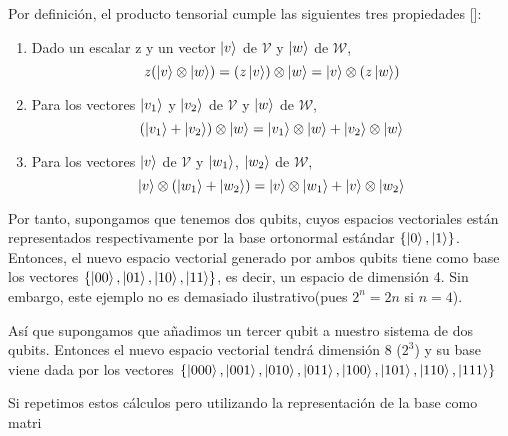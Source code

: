 Por definición, el producto tensorial cumple las siguientes tres propiedades [\cite{nielsen2001quantum}]:
\begin{enumerate}
\item Dado un escalar z y un vector $\left|v\right\rangle$ de $\mathcal{V}$ y $\left|w\right\rangle$ de $\mathcal{W}$,\\
\begin{equation}
z(\left|v\right\rangle\otimes\left|w\right\rangle)= (z\left|v\right\rangle)\otimes\left|w\right\rangle = \left|v\right\rangle\otimes (z\left|w\right\rangle)
\end{equation}

\item Para los vectores $\left|v_1\right\rangle$  y $\left|v_2\right\rangle$ de $\mathcal{V}$ y $\left|w\right\rangle$ de $\mathcal{W}$,\\
\begin{equation}
(\left|v_1\right\rangle+\left|v_2\right\rangle)\otimes\left|w\right\rangle=\left|v_1\right\rangle\otimes\left|w\right\rangle+\left|v_2\right\rangle\otimes\left|w\right\rangle
\end{equation}

\item Para los vectores $\left|v\right\rangle$ de $\mathcal{V}$ y $\left|w_1\right\rangle$, $\left|w_2\right\rangle$ de $\mathcal{W}$,\\
\begin{equation}
\left|v\right\rangle\otimes (\left|w_1\right\rangle+\left|w_2\right\rangle) = \left|v\right\rangle\otimes\left|w_1\right\rangle +\left|v\right\rangle\otimes\left|w_2\right\rangle 
\end{equation}
\end{enumerate}

Por tanto, supongamos que tenemos dos qubits, cuyos espacios vectoriales están representados respectivamente por la base ortonormal estándar $\{\left|0\right\rangle,\left|1\right\rangle\}$. Entonces, el nuevo espacio vectorial 
generado por ambos qubits tiene como base los vectores $\{\left|00\right\rangle,\left|01\right\rangle,\left|10\right\rangle,\left|11\right\rangle\}$, es decir, un espacio de dimensión 4. Sin embargo, este ejemplo no es demasiado ilustrativo(pues $2^n = 2n$ si $n=4$).

Así que supongamos que añadimos un tercer qubit a nuestro sistema de dos qubits. Entonces el nuevo espacio vectorial tendrá dimensión 8 ($2^3$) y su base viene dada por los vectores $\{\left|000\right\rangle,\left|001\right\rangle,\left|010\right\rangle,\left|011\right\rangle,\left|100\right\rangle,\left|101\right\rangle,\left|110\right\rangle,\left|111\right\rangle\}$

Si repetimos estos cálculos pero utilizando la representación de la base como matri